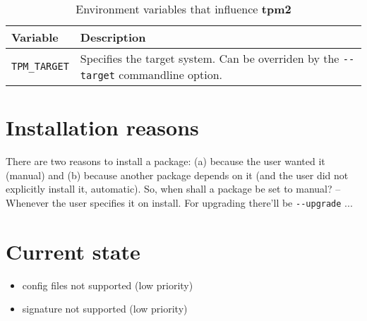 \documentclass[a4paper]{scrartcl}
\newcommand{\program}[1]{\textbf{#1}}
\begin{document}
	\begin{table}[ht]
		\centering
		
		\begin{tabularx}{.9\textwidth}{l|X}
			Variable & Description \\
			\hline
			\texttt{TPM\_TARGET} & Specifies the target system. Can be overriden by the \texttt{-{}-target} commandline option. \\
		\end{tabularx}
	
		\caption{Environment variables that influence \program{tpm2}}
		\label{tab:environment_variables_for_tpm2}
	\end{table}


	\section{Installation reasons}
	\label{sec:installation_reasons}
	
	There are two reasons to install a package: (a) because the user wanted it (manual) and (b) because another package depends on it (and the user did not explicitly install it, automatic). So, when shall a package be set to manual? -- Whenever the user specifies it on install. For upgrading there'll be \texttt{-{}-upgrade} ...






	\section{Current state}
	\label{sec:current_state}
	
	\begin{itemize}
		\item config files not supported (low priority)
		\item signature not supported (low priority)
	\end{itemize}
	
\end{document}
